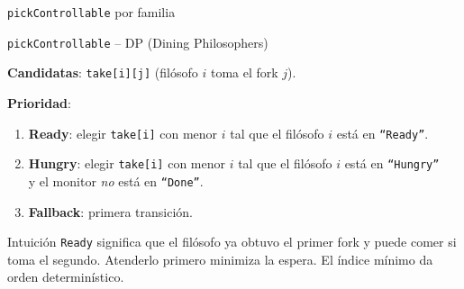\documentclass{beamer}
\begin{document}
\begin{frame}{}
\begin{center}
\Huge \texttt{pickControllable} por familia
\end{center}
\end{frame}

\begin{frame}{\texttt{pickControllable} -- DP (Dining Philosophers)}

\textbf{Candidatas}: \texttt{take[i][j]} (fil\'osofo $i$ toma el fork $j$).

\bigskip
\textbf{Prioridad}:
\begin{enumerate}
  \item \textbf{Ready}: elegir \texttt{take[i]} con menor $i$ tal que el fil\'osofo $i$ est\'a en \texttt{``Ready''}.
  \item \textbf{Hungry}: elegir \texttt{take[i]} con menor $i$ tal que el fil\'osofo $i$ est\'a en \texttt{``Hungry''}\\
    y el monitor \emph{no} est\'a en \texttt{``Done''}.
  \item \textbf{Fallback}: primera transici\'on.
\end{enumerate}

\bigskip
\begin{block}{Intuici\'on}
\texttt{Ready} significa que el fil\'osofo ya obtuvo el primer fork y puede comer si toma el segundo. Atenderlo primero minimiza la espera. El \'indice m\'inimo da orden determin\'istico.
\end{block}
\end{frame}
\end{document}
